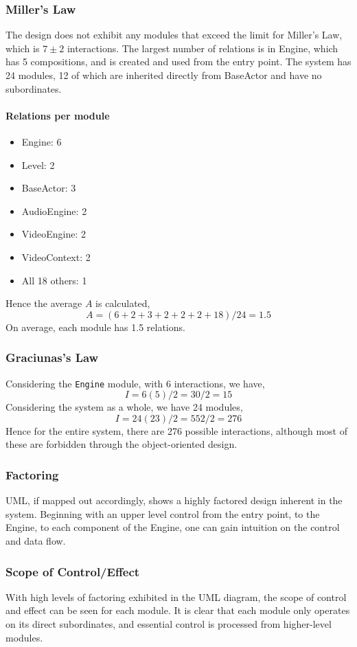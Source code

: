 \documentclass{article}
\begin{document}
		\subsubsection{Miller's Law}
			The design does not exhibit any modules that exceed the limit for Miller's Law, which is $7\pm2$ interactions. The largest number of relations is in Engine, which has 5 compositions, and is created and used from the entry point. The system has 24 modules, 12 of which are inherited directly from BaseActor and have no subordinates.
			
			\paragraph{Relations per module}
			\begin{itemize}
				\item Engine: 6
				\item Level: 2
				\item BaseActor: 3
				\item AudioEngine: 2
				\item VideoEngine: 2
				\item VideoContext: 2
				\item All 18 others: 1
			\end{itemize}
			
			Hence the average $A$ is calculated,
			$$A = (6 + 2 + 3 + 2 + 2 + 2 + 18)/24 = 1.5$$
			On average, each module has 1.5 relations.
		\subsubsection{Graciunas's Law}
			Considering the \texttt{Engine} module, with 6 interactions, we have,
			$$I = 6(5)/2 = 30/2 = 15$$
			Considering the system as a whole, we have 24 modules,
			$$I = 24(23)/2 = 552/2 = 276$$
			Hence for the entire system, there are 276 possible interactions, although most of these are forbidden through the object-oriented design.
		\subsubsection{Factoring}
			UML, if mapped out accordingly, shows a highly factored design inherent in the system. Beginning with an upper level control from the entry point, to the Engine, to each component of the Engine, one can gain intuition on the control and data flow.
		\subsubsection{Scope of Control/Effect}
			With high levels of factoring exhibited in the UML diagram, the scope of control and effect can be seen for each module. It is clear that each module only operates on its direct subordinates, and essential control is processed from higher-level modules.
\end{document}
